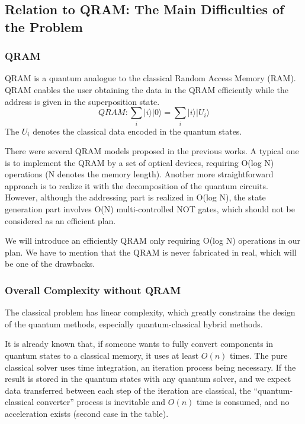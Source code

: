 \documentclass[%
 reprint,
 amsmath,amssymb,
pra,
]{revtex4-1}
\begin{document}
\subsection{Relation to QRAM: The Main Difficulties of the Problem}

\subsubsection{QRAM}

QRAM is a quantum analogue to the classical Random Access Memory (RAM). QRAM enables the user obtaining the data in the QRAM efficiently while the address is given in the superposition state. 
$$
QRAM: \sum_i{|i\rangle|0\rangle}=\sum_i{|i\rangle|U_i\rangle}
$$
The $U_i$ denotes the classical data encoded in the quantum states.

There were several QRAM models proposed in the previous works. A typical one is to implement the QRAM by a set of optical devices, requiring O(log N) operations (N denotes the memory length). Another more straightforward approach is to realize it with the decomposition of the quantum circuits. However, although the addressing part is realized in O(log N), the state generation part involves O(N) multi-controlled NOT gates, which should not be considered as an efficient plan.

We will introduce an efficiently QRAM only requiring O(log N) operations in our plan. We have to mention that the QRAM is never fabricated in real, which will be one of the drawbacks.

\subsubsection{Overall Complexity without QRAM }

The classical problem has linear complexity, which greatly constrains the design of the quantum methods, especially quantum-classical hybrid methods. 

It is already known that, if someone wants to fully convert components in quantum states to a classical memory, it uses at least $O(n)$ times. The pure classical solver uses time integration, an iteration process being necessary. If the result is stored in the quantum states with any quantum solver, and we expect data transferred between each step of the iteration are classical, the “quantum-classical converter” process is inevitable and $O(n)$ time is consumed, and no acceleration exists (second case in the table).
\end{document}
